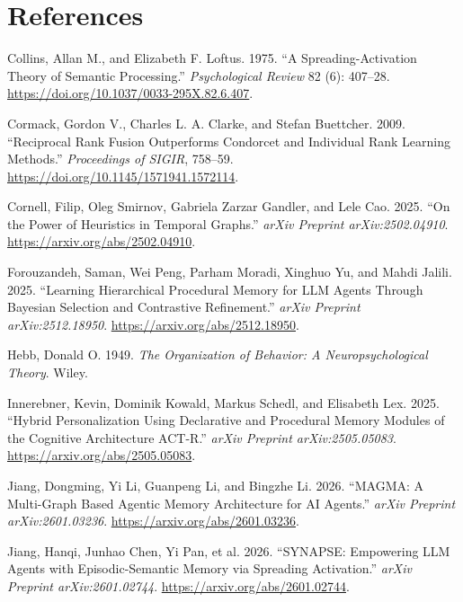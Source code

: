\documentclass[
  american,
  11pt,
]{article}
\newlength{\cslhangindent}
\newenvironment{CSLReferences}[2] %
 {\begin{list}{}{%
  \setlength{\itemindent}{0pt}
  \setlength{\leftmargin}{0pt}
  \setlength{\parsep}{0pt}
  \ifodd #1
   \setlength{\leftmargin}{\cslhangindent}
   \setlength{\itemindent}{-1\cslhangindent}
  \fi
  \setlength{\itemsep}{#2\baselineskip}}}
 {\end{list}}
\begin{document}
\section*{References}\label{references}

\protect{}\label{refs}
\begin{CSLReferences}{1}{1}
Collins, Allan M., and Elizabeth F. Loftus. 1975. {``A Spreading-Activation Theory of Semantic Processing.''}
\emph{Psychological Review} 82 (6): 407--28. \url{https://doi.org/10.1037/0033-295X.82.6.407}.

Cormack, Gordon V., Charles L. A. Clarke, and Stefan Buettcher. 2009. {``Reciprocal Rank Fusion Outperforms
Condorcet and Individual Rank Learning Methods.''} \emph{Proceedings of SIGIR}, 758--59.
\url{https://doi.org/10.1145/1571941.1572114}.

Cornell, Filip, Oleg Smirnov, Gabriela Zarzar Gandler, and Lele Cao. 2025. {``On the Power of Heuristics in
Temporal Graphs.''} \emph{arXiv Preprint arXiv:2502.04910}. \url{https://arxiv.org/abs/2502.04910}.

Forouzandeh, Saman, Wei Peng, Parham Moradi, Xinghuo Yu, and Mahdi Jalili. 2025. {``Learning Hierarchical
Procedural Memory for {LLM} Agents Through Bayesian Selection and Contrastive Refinement.''} \emph{arXiv
Preprint arXiv:2512.18950}. \url{https://arxiv.org/abs/2512.18950}.

Hebb, Donald O. 1949. \emph{The Organization of Behavior: A Neuropsychological Theory}. Wiley.

Innerebner, Kevin, Dominik Kowald, Markus Schedl, and Elisabeth Lex. 2025. {``Hybrid Personalization Using
Declarative and Procedural Memory Modules of the Cognitive Architecture {ACT-R}.''} \emph{arXiv Preprint
arXiv:2505.05083}. \url{https://arxiv.org/abs/2505.05083}.

Jiang, Dongming, Yi Li, Guanpeng Li, and Bingzhe Li. 2026. {``{MAGMA}: A Multi-Graph Based Agentic Memory
Architecture for {AI} Agents.''} \emph{arXiv Preprint arXiv:2601.03236}.
\url{https://arxiv.org/abs/2601.03236}.

Jiang, Hanqi, Junhao Chen, Yi Pan, et al. 2026. {``{SYNAPSE}: Empowering {LLM} Agents with Episodic-Semantic
Memory via Spreading Activation.''} \emph{arXiv Preprint arXiv:2601.02744}.
\url{https://arxiv.org/abs/2601.02744}.


\end{CSLReferences}
\end{document}
